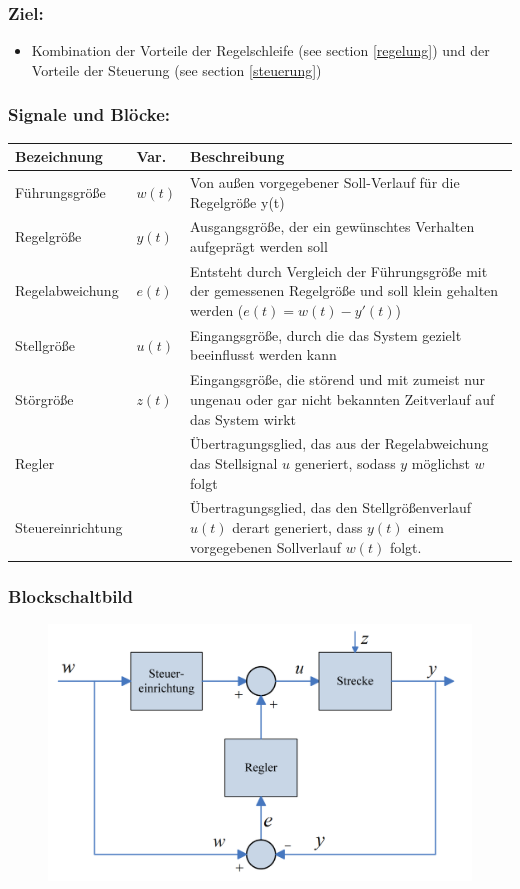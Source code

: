 \documentclass[10pt,a4paper]{article}
\begin{document}
\subsubsection*{Ziel:}
\begin{itemize}
		\item Kombination der Vorteile der Regelschleife (see section \ref{regelung}) und der Vorteile der Steuerung (see section \ref{steuerung})
\end{itemize}

\subsubsection*{Signale und Blöcke:}

\begin{tabularx}{\columnwidth}{llX}
	Bezeichnung & Var. & Beschreibung \\
	\hline
	Führungsgröße & $w(t)$ & Von außen vorgegebener Soll-Verlauf für die Regelgröße y(t) \\
	Regelgröße & $y(t)$ & Ausgangsgröße, der ein gewünschtes Verhalten aufgeprägt werden soll \\
	Regelabweichung & $e(t)$ & Entsteht durch Vergleich der Führungsgröße mit der gemessenen Regelgröße und soll klein gehalten werden ($e(t) = w(t) - y'(t)$) \\
	Stellgröße & $u(t)$ & Eingangsgröße, durch die das System gezielt beeinflusst werden kann \\
	Störgröße & $z(t)$ & Eingangsgröße, die störend und mit zumeist nur ungenau oder gar nicht bekannten Zeitverlauf auf das System wirkt \\
	Regler && Übertragungsglied, das aus der Regelabweichung das Stellsignal $u$ generiert, sodass $y$ möglichst $w$ folgt \\
	Steuereinrichtung && Übertragungsglied, das den Stellgrößenverlauf $u(t)$ derart generiert, dass $y(t)$ einem vorgegebenen Sollverlauf $w(t)$ folgt.
\end{tabularx}

\subsubsection*{Blockschaltbild}
\begin{figure}[H]
	\includegraphics[width=0.8\columnwidth]{imgs/abb1_8.png}
\end{figure}
\end{document}
